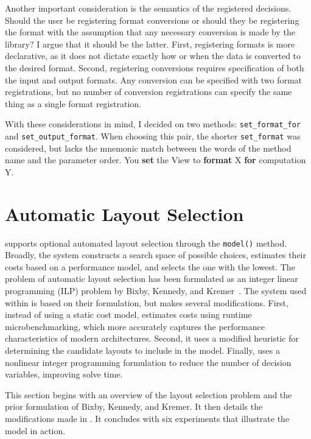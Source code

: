 Another important consideration is the semantics of the registered decisions. 
Should the user be registering format conversions or should they be registering the format with the assumption that any necessary conversion is made by the library?
I argue that it should be the latter.
First, registering formats is more declarative, as it does not dictate exactly how or when the data is converted to the desired format.
Second, registering conversions requires specification of both the input and output formats. 
Any conversion can be specified with two format registrations, but no number of conversion registrations can specify the same thing as a single format registration.

With these considerations in mind, I decided on two methods: \verb.set_format_for. and \verb.set_output_format..
When choosing this pair, the shorter \verb.set_format. was considered, but lacks the mnemonic match between the words of the method name and the parameter order. You \textbf{set} the View to \textbf{format} X \textbf{for} computation Y. 


\section{Automatic Layout Selection}

\FormatDecisions{} supports optional automated layout selection through the \verb.model(). method.
Broadly, the system constructs a search space of possible choices, estimates their costs based on a performance model, and selects the one with the lowest.
The problem of automatic layout selection has been formulated as an integer linear programming (ILP) problem by Bixby, Kennedy, and Kremer~\cite{bixby1994automatic}.
The system used within \FormatDecisions{} is based on their formulation, but makes several modifications.
First, instead of using a static cost model, \FormatDecisions{} estimates costs using runtime microbenchmarking, which more accurately captures the performance characteristics of modern architectures.
Second, it uses a modified heuristic for determining the candidate layouts to include in the model.
Finally, \FormatDecisions{} uses a nonlinear integer programming formulation to reduce the number of decision variables, improving solve time.

This section begins with an overview of the layout selection problem and the prior formulation of Bixby, Kennedy, and Kremer.
It then details the modifications made in \FormatDecisions{}.
It concludes with six experiments that illustrate the model in action.

